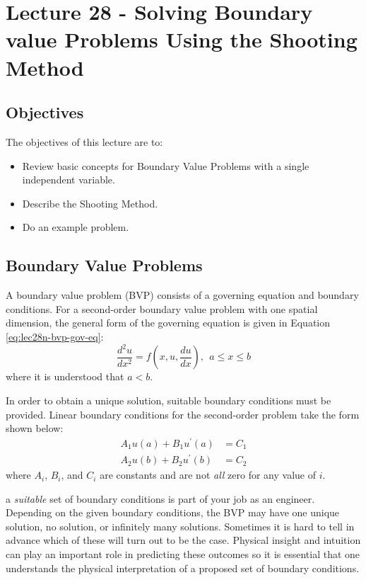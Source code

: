 \chapter{Lecture 28 - Solving Boundary value Problems Using the Shooting Method}
\label{ch:lec28n}
\section{Objectives}
The objectives of this lecture are to:
\begin{itemize}
\item Review basic concepts for Boundary Value Problems with a single independent variable.
\item Describe the Shooting Method.
\item Do an example problem.
\end{itemize}
\setcounter{lstannotation}{0}

\section{Boundary Value Problems}
A boundary value problem (BVP) consists of a governing equation and boundary conditions.  For a second-order boundary value problem with one spatial dimension, the general form of the governing equation is given in Equation \ref{eq:lec28n-bvp-gov-eq}:
\begin{equation}
\frac{d^2 u}{dx^2} = f\left(x,u,\frac{du}{dx}\right), \ \ a\le x \le b
\label{eq:lec28n-bvp-gov-eq}
\end{equation}
where it is understood that $a<b$.  

In order to obtain a unique solution, suitable boundary conditions must be provided.  Linear boundary conditions for the second-order problem take the form shown below:
\begin{align*}
A_1u(a)+B_1u^{\prime}(a)&=C_1 \\
A_2u(b)+B_2u^{\prime}(b)&=C_2
\end{align*}
where $A_i$, $B_i$, and $C_i$ are constants and are not \emph{all} zero for any value of $i$.

 a \emph{suitable} set of boundary conditions is part of your job as an engineer.  Depending on the given boundary conditions, the BVP may have one unique solution, no solution, or infinitely many solutions. Sometimes it is hard to tell in advance which of these will turn out to be the case.  Physical insight and intuition can play an important role in predicting these outcomes so it is essential that one understands the physical interpretation of a proposed set of boundary conditions.

